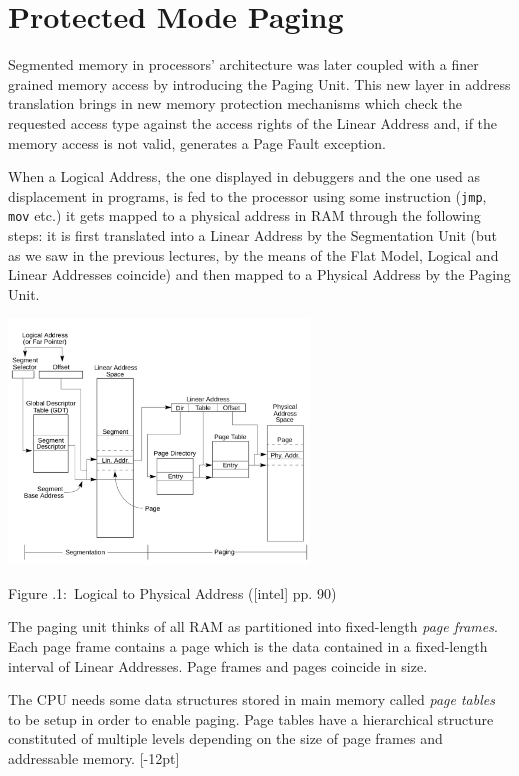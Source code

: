 \documentclass[twoside]{article}
\newcounter{lecnum}
\renewcommand{\cite}[1]{[#1]}
\newcommand{\fig}[3]{
            \vspace{#2}
            \begin{center}
            Figure \thelecnum.#1:~#3
            \end{center}
    }
\begin{document}
\section{Protected Mode Paging}

Segmented memory in processors' architecture was later coupled with a finer grained memory access by introducing the Paging Unit. This new layer in address translation brings in new memory protection mechanisms which check the requested access type against the access rights of the Linear Address and, if the memory access is not valid, generates a Page Fault exception.

When a Logical Address, the one displayed in debuggers and the one used as displacement in programs, is fed to the processor using some instruction (\texttt{jmp}, \texttt{mov} etc.) it gets mapped to a physical address in RAM through the following steps: it is first translated into a Linear Address by the Segmentation Unit (but as we saw in the previous lectures, by the means of the Flat Model, Logical and Linear Addresses coincide) and then mapped to a Physical Address by the Paging Unit.

\begin{center}
  \includegraphics[width=0.6\textwidth]{segpag.png}
  \fig{1}{0 pt}{Logical to Physical Address (\cite{intel} pp. 90) }
\end{center}

The paging unit thinks of all RAM as partitioned into fixed-length \textit{page frames}. Each page frame contains a page which is the data contained in a fixed-length interval of Linear Addresses. Page frames and pages coincide in size.

The CPU needs some data structures stored in main memory called \textit{page tables} to be setup in order to enable paging. Page tables have a hierarchical structure constituted of multiple levels depending on the size of page frames and addressable memory. [-12pt]
\end{document}
